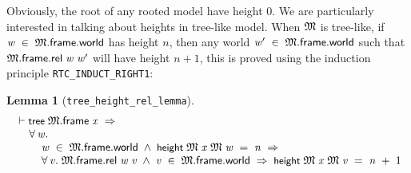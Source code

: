 \documentclass[letterpaper]{article}
\newtheorem{lm}{Lemma}
\renewcommand{\HOLConst}[1]{{\textsf{\upshape\small #1}}}
\renewcommand{\HOLinline}[1]{\ensuremath{#1}}
\newenvironment{holmath}{\begin{displaymath}\begin{array}{l}}{\end{array}\end{displaymath}\ignorespacesafterend}
\begin{document}
Obviously, the root of any rooted model have height $0$. We are particularly interested in talking about heights in tree-like model. When \HOLinline{\HOLFreeVar{\ensuremath{\mathfrak{M}}}} is tree-like, if \HOLinline{\HOLFreeVar{w}\;\HOLSymConst{\HOLTokenIn{}}\;\HOLFreeVar{\ensuremath{\mathfrak{M}}}.\HOLFieldName{frame}.\HOLFieldName{world}} has height $n$, then any world \HOLinline{\HOLFreeVar{w\sp{\prime}}\;\HOLSymConst{\HOLTokenIn{}}\;\HOLFreeVar{\ensuremath{\mathfrak{M}}}.\HOLFieldName{frame}.\HOLFieldName{world}} such that \HOLinline{\HOLFreeVar{\ensuremath{\mathfrak{M}}}.\HOLFieldName{frame}.\HOLFieldName{rel}\;\HOLFreeVar{w}\;\HOLFreeVar{w\sp{\prime}}} will have height $n+1$, this is proved using the induction principle \texttt{RTC_INDUCT_RIGHT1}:
\begin{lm}[\texttt{tree_height_rel_lemma}]
\begin{holmath}
  \ensuremath{\HOLTokenTurnstile}\HOLConst{tree}\;\HOLFreeVar{\ensuremath{\mathfrak{M}}}.\HOLFieldName{frame}\;\HOLFreeVar{x}\;\HOLSymConst{\HOLTokenImp{}}\\
\;\;\;\;\;\HOLSymConst{\HOLTokenForall{}}\HOLBoundVar{w}.\\
\;\;\;\;\;\;\;\;\;\HOLBoundVar{w}\;\HOLSymConst{\HOLTokenIn{}}\;\HOLFreeVar{\ensuremath{\mathfrak{M}}}.\HOLFieldName{frame}.\HOLFieldName{world}\;\HOLSymConst{\HOLTokenConj{}}\;\HOLConst{height}\;\HOLFreeVar{\ensuremath{\mathfrak{M}}}\;\HOLFreeVar{x}\;\HOLFreeVar{\ensuremath{\mathfrak{M}}}\;\HOLBoundVar{w}\;\HOLSymConst{=}\;\HOLFreeVar{n}\;\HOLSymConst{\HOLTokenImp{}}\\
\;\;\;\;\;\;\;\;\;\HOLSymConst{\HOLTokenForall{}}\HOLBoundVar{v}.\;\HOLFreeVar{\ensuremath{\mathfrak{M}}}.\HOLFieldName{frame}.\HOLFieldName{rel}\;\HOLBoundVar{w}\;\HOLBoundVar{v}\;\HOLSymConst{\HOLTokenConj{}}\;\HOLBoundVar{v}\;\HOLSymConst{\HOLTokenIn{}}\;\HOLFreeVar{\ensuremath{\mathfrak{M}}}.\HOLFieldName{frame}.\HOLFieldName{world}\;\HOLSymConst{\HOLTokenImp{}}\;\HOLConst{height}\;\HOLFreeVar{\ensuremath{\mathfrak{M}}}\;\HOLFreeVar{x}\;\HOLFreeVar{\ensuremath{\mathfrak{M}}}\;\HOLBoundVar{v}\;\HOLSymConst{=}\;\HOLFreeVar{n}\;\HOLSymConst{\ensuremath{+}}\;\HOLNumLit{1}
\end{holmath}
\end{lm}
\end{document}
